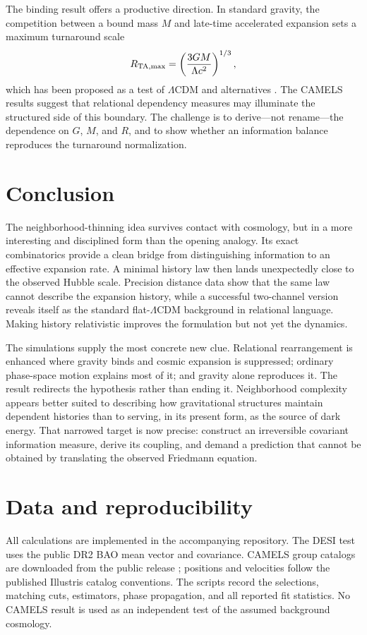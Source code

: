 \documentclass[10pt,twocolumn]{article}
\newcommand{\LCDM}{$\Lambda$CDM}
\begin{document}
The binding result offers a productive direction.  In standard gravity, the
competition between a bound mass $M$ and late-time accelerated expansion sets
a maximum turnaround scale
\begin{equation}
 R_{\rm TA,max}=\left(\frac{3GM}{\Lambda c^2}\right)^{1/3},
\end{equation}
which has been proposed as a test of \LCDM{} and alternatives
\citep{Pavlidou2014}.  The CAMELS results suggest that relational dependency
measures may illuminate the structured side of this boundary.  The challenge
is to derive---not rename---the dependence on $G$, $M$, and $R$, and to show
whether an information balance reproduces the turnaround normalization.

\section{Conclusion}

The neighborhood-thinning idea survives contact with cosmology, but in a more
interesting and disciplined form than the opening analogy.  Its exact
combinatorics provide a clean bridge from distinguishing information to an
effective expansion rate.  A minimal history law then lands unexpectedly close
to the observed Hubble scale.  Precision distance data show that the same law
cannot describe the expansion history, while a successful two-channel version
reveals itself as the standard flat-\LCDM{} background in relational language.
Making history relativistic improves the formulation but not yet the dynamics.

The simulations supply the most concrete new clue.  Relational rearrangement
is enhanced where gravity binds and cosmic expansion is suppressed; ordinary
phase-space motion explains most of it; and gravity alone reproduces it.  The
result redirects the hypothesis rather than ending it.  Neighborhood
complexity appears better suited to describing how gravitational structures
maintain dependent histories than to serving, in its present form, as the
source of dark energy.  That narrowed target is now precise: construct an
irreversible covariant information measure, derive its coupling, and demand a
prediction that cannot be obtained by translating the observed Friedmann
equation.

\section*{Data and reproducibility}

All calculations are implemented in the accompanying repository.  The DESI
test uses the public DR2 BAO mean vector and covariance.  CAMELS group catalogs
are downloaded from the public release \citep{CAMELSRelease2022}; positions and
velocities follow the published Illustris catalog conventions.  The scripts
record the selections, matching cuts, estimators, phase propagation, and all
reported fit statistics.  No CAMELS result is used as an independent test of
the assumed background cosmology.



\end{document}
